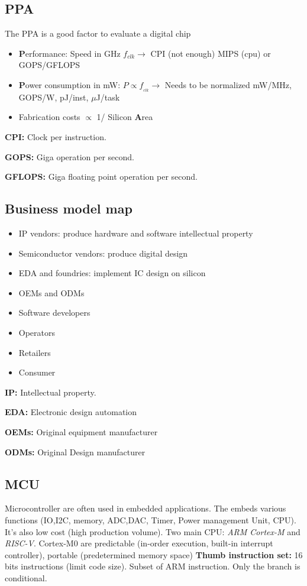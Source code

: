 \subsection{PPA}
The PPA is a good factor to evaluate a digital chip
\begin{itemize}
  \item \textbf{P}erformance:
    \subitem Speed in GHz
    \subitem \(f_{clk} \rightarrow\) CPI (not enough)
    \subitem MIPS (cpu) or GOPS/GFLOPS
  \item \textbf{P}ower consumption in mW:
    \subitem \(P \propto f_{_{clk}} \rightarrow\) Needs to be normalized
      \subitem mW/MHz, GOPS/W, pJ/inst, \(\mu\)J/task
    \item Fabrication costs \(\propto\) 1/ Silicon \textbf{A}rea
\end{itemize}

\textbf{CPI:} Clock per instruction.

\textbf{GOPS:} Giga operation per second.

\textbf{GFLOPS:} Giga floating point operation per second.



\subsection{Business model map}
\begin{itemize}
  \item IP vendors: produce hardware and software intellectual property
  \item Semiconductor vendors: produce digital design
  \item EDA and foundries: implement IC design on silicon
  \item OEMs and ODMs
  \item Software developers
  \item Operators
  \item Retailers
  \item Consumer
\end{itemize}
\bigbreak
\textbf{IP:} Intellectual property.

\textbf{EDA:} Electronic design automation

\textbf{OEMs:} Original equipment manufacturer

\textbf{ODMs:} Original Design manufacturer



\subsection{MCU}
Microcontroller are often used in embedded applications. The embeds various functions (IO,I2C, memory, ADC,DAC, Timer, Power management Unit, CPU). It's also low cost (high production volume).
\bigbreak
Two main CPU: \textit{ARM Cortex-M} and \textit{RISC-V}. Cortex-M0 are predictable (in-order execution, built-in interrupt controller), portable (predetermined memory space)
\bigbreak
\textbf{Thumb instruction set:} 16 bits instructions (limit code size). Subset of ARM instruction. Only the branch is conditional.
\bigbreak
